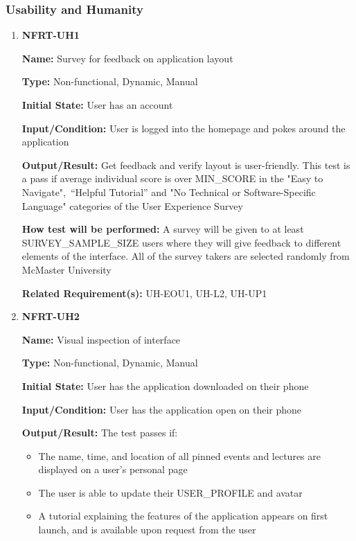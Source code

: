 \documentclass[12pt, titlepage]{article}
\begin{document}
\subsubsection{Usability and Humanity}

\begin{enumerate}
\item{\textbf{NFRT-UH1}}

\textbf{Name:} Survey for feedback on application layout

\textbf{Type:} Non-functional, Dynamic, Manual
					
\textbf{Initial State:} User has an account

\textbf{Input/Condition:} User is logged into the homepage and pokes around the application
					
\textbf{Output/Result:} Get feedback and verify layout is user-friendly. This test is a pass if average individual score is over MIN\_SCORE in the "Easy to Navigate",\
“Helpful Tutorial” and "No Technical or Software-Specific Language" categories of the User Experience Survey
					
\textbf{How test will be performed:} A survey will be given to at least
SURVEY\_SAMPLE\_SIZE users where they will give feedback to different elements of the interface. All of the survey takers are selected randomly from McMaster University

\textbf{Related Requirement(s):} UH-EOU1, UH-L2, UH-UP1

\item{\textbf{NFRT-UH2}}

\textbf{Name:} Visual inspection of interface

\textbf{Type:} Non-functional, Dynamic, Manual
					
\textbf{Initial State:} User has the application downloaded on their phone
					
\textbf{Input/Condition:} User has the application open on their phone
					
\textbf{Output/Result:} The test passes if:
\begin{itemize}
  \item The name, time, and location of all pinned events and lectures are displayed on a user's personal page
  \item The user is able to update their USER\_PROFILE and avatar
  \item A tutorial explaining the features of the application appears on first launch, and is available upon request from the user
\end{itemize}


\end{enumerate}
\end{document}
